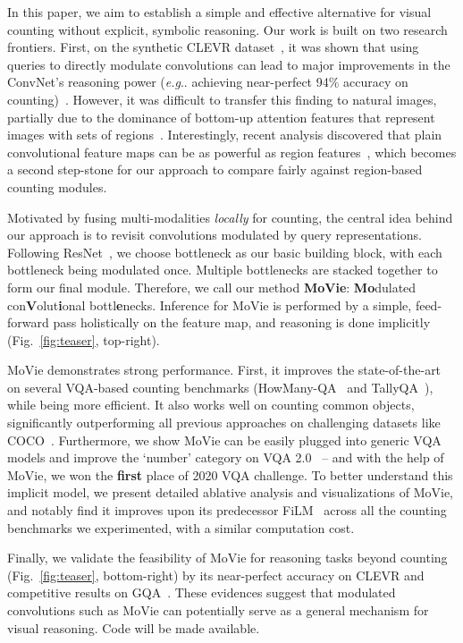 \documentclass{article} \usepackage[dvipsnames,table]{xcolor}
\makeatletter
\newcommand{\ours}[0]{MoVie\xspace}
\DeclareRobustCommand\onedot{\futurelet\@let@token\@onedot}
\def\@onedot{\ifx\@let@token.\else.\null\fi\xspace}
\def\eg{\emph{e.g}\onedot} \def\Eg{\emph{E.g}\onedot}
\makeatother
\begin{document}
In this paper, we aim to establish a simple and effective alternative for visual counting without explicit, symbolic reasoning. Our work is built on two research frontiers. First, on the synthetic CLEVR dataset~\cite{johnson2017clevr}, it was shown that using queries to directly modulate convolutions can lead to major improvements in the ConvNet's reasoning power (\eg achieving near-perfect 94\% accuracy on counting)~\cite{perez2018film}. However, it was difficult to transfer this finding to natural images, partially due to the dominance of bottom-up attention features that represent images with sets of regions~\cite{anderson2018bottom}. Interestingly, recent analysis discovered that plain convolutional feature maps can be as powerful as region features~\cite{jiang2020defense}, which becomes a second step-stone for our approach to compare fairly against region-based counting modules.

Motivated by fusing multi-modalities \emph{locally} for counting, the central idea behind our approach is to revisit convolutions modulated by query representations. Following ResNet~\cite{he2016deep}, we choose bottleneck as our basic building block, with each bottleneck being modulated once. Multiple bottlenecks are stacked together to form our final module. Therefore, we call our method \textbf{\ours}: \textbf{Mo}dulated con\textbf{V}olut\textbf{i}onal bottl\textbf{e}necks. Inference for \ours is performed by a simple, feed-forward pass holistically on the feature map, and reasoning is done implicitly (Fig.~\ref{fig:teaser}, top-right).

\ours demonstrates strong performance. First, it improves the state-of-the-art on several VQA-based counting benchmarks (HowMany-QA~\cite{trott2018interpretable} and TallyQA~\cite{acharya2019tallyqa}), while being more efficient. It also works well on counting common objects, significantly outperforming all previous approaches on challenging datasets like COCO~\cite{lin2014microsoft}. Furthermore, we show \ours can be easily plugged into generic VQA models and improve the `number' category on VQA 2.0~\cite{goyal2017making} -- and with the help of \ours, we won the \textbf{first} place of 2020 VQA challenge. To better understand this implicit model, we present detailed ablative analysis and visualizations of \ours, and notably find it improves upon its predecessor FiLM~\cite{perez2018film} across all the counting benchmarks we experimented, with a similar computation cost.

Finally, we validate the feasibility of \ours for reasoning tasks beyond counting (Fig.~\ref{fig:teaser}, bottom-right) by its near-perfect accuracy on CLEVR and competitive results on GQA~\cite{hudson2019gqa}. These evidences suggest that modulated convolutions such as \ours can potentially serve as a general mechanism for visual reasoning. Code will be made available. 
\end{document}
